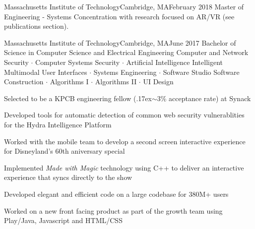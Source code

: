 \documentclass{article}
\begin{document}

    \schoolwithcourses
        {Massachusetts Institute of Technology}{Cambridge, MA}{February 2018 }
        {Master of Engineering - Systems Concentration with research focused on AR/VR (see publications section).}
        
    \schoolwithcourses
        {Massachusetts Institute of Technology}{Cambridge, MA}{June 2017 }
        {Bachelor of Science in Computer Science and Electrical Engineering}
    \relatedcoursework
        {Computer and Network Security $\cdot$ Computer Systems Security  $\cdot$ Artificial Intelligence}
        {Intelligent Multimodal User Interfaces  $\cdot$ Systems Engineering $\cdot$ Software Studio}
        {Software Construction $\cdot$ Algorithms I $\cdot$ Algorithms II  $\cdot$ UI Design}

\vspace{5pt} 
     
        \begin{achievements}
            \item{Selected to be a KPCB engineering fellow ({\raise.17ex\hbox{$\scriptstyle\mathtt{\sim}$}}3\% acceptance rate) at Synack}
            \item{Developed tools for automatic detection of common web security vulnerablities for the Hydra Intelligence Platform}
        \end{achievements}
    
        \begin{achievements}
            \item{Worked with the mobile team to develop a second screen interactive experience for Disneyland's 60th aniversary special}
            \item{Implemented \textit{Made with Magic} technology using C++ to deliver an interactive experience that syncs directly to the show}
        \end{achievements}
    
        \begin{achievements}
            \item{Developed elegant and efficient code on a large codebase for 380M+ users}
            \item{Worked on a new front facing product as part of the growth team using Play/Java, Javascript and HTML/CSS}
        \end{achievements}
    
\end{document}

